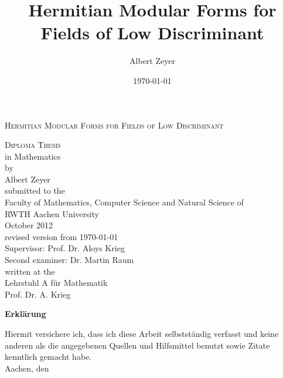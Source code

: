 \documentclass[twoside,openright]{article}
\begin{document}
\title{Hermitian Modular Forms for Fields of Low Discriminant}
\author{Albert Zeyer}
\date{\today}

\begin{titlepage}
\begin{center}
\setlength{\parskip}{2ex plus0.5ex minus0.2ex}
\setlength{\baselineskip}{5ex}
\textsc{\LARGE Hermitian Modular Forms for Fields of Low Discriminant}\\[2cm]

\setlength{\baselineskip}{3ex}

\textsc{Diploma Thesis} \\
in Mathematics \\[0.7cm]

by \\
Albert Zeyer \\[3cm]

submitted to the \\
Faculty of Mathematics, Computer Science and Natural Science of \\
RWTH Aachen University \\[1.5cm]

October 2012 \\
revised version from \today \\[1.5cm]

Supervisor: Prof. Dr. Aloys Krieg \\
Second examiner: Dr. Martin Raum \\[1.5cm]

written at the \\
Lehrstuhl A für Mathematik \\
Prof. Dr. A. Krieg

\end{center}
\end{titlepage}


\newpage
\thispagestyle{empty}
\mbox{}

\begin{titlepage}
\setlength{\parindent}{0pt}
\setlength{\parskip}{3ex}
\textbf{\large Erklärung}

Hiermit versichere ich, dass ich diese Arbeit selbstständig verfasst und keine anderen als die angegebenen Quellen und Hilfsmittel benutzt sowie Zitate kenntlich gemacht habe.\\

Aachen, den \todaygerman
\end{titlepage}
\end{document}
